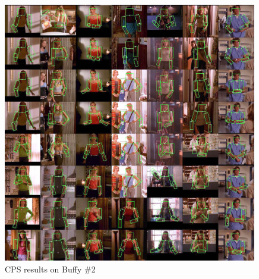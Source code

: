 \begin{figure}[tb]
\begin{center}
\includegraphics[width=0.99\textwidth]{figs/buffy_test_tiled_cps-2.jpg}
\caption[CPS results on Buffy \#2]{CPS results on Buffy \#2}
\label{fig:buffy-cps2}
\end{center}
\end{figure}
